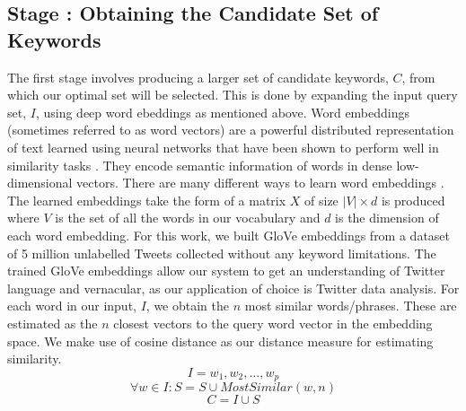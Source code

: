 \documentclass[runningheads]{llncs}
\newcommand{\RNum}[1]{\uppercase\expandafter{\romannumeral #1\relax}}
\begin{document}
\subsection{Stage \RNum{1}: Obtaining the Candidate Set of Keywords}
The first stage involves producing a larger set of candidate keywords, $C$, from which our optimal set will be selected. This is done by expanding the input query set, $I$, using deep word ebeddings as mentioned above. Word embeddings (sometimes referred to as word vectors) are a powerful distributed representation of text learned using neural networks that have been shown to perform well in similarity tasks \cite{REF19}. They encode semantic information of words in dense low-dimensional vectors. There are many different ways to learn word embeddings \cite{REF13,REF14,REF15}. The learned embeddings take the form of a matrix $X$ of size $|V| \times d$ is produced where $V$  is the set of all the words in our vocabulary and $d$ is the dimension of each word embedding. For this work, we built GloVe embeddings \cite{REF13} from a dataset of 5 million unlabelled Tweets collected without any keyword limitations. The trained GloVe embeddings allow our system to get an understanding of Twitter language and vernacular, as our application of choice is Twitter data analysis. For each word in our input, $I$, we obtain the $n$ most similar words/phrases. These are estimated as the $n$ closest vectors to the query word vector in the embedding space. We make use of cosine distance \cite{HREF9} as our distance measure for estimating similarity. 
\begin{equation}\label{eqn:candidatesA}
I = {w_1, w_2, \ldots, w_p}
\end{equation}
\begin{equation}\label{eqn:candidatesB}
\forall w \in I: S = S \cup MostSimilar(w, n)
\end{equation}
\begin{equation}\label{eqn:candidatesC}
C = I \cup S
\end{equation}
\end{document}
